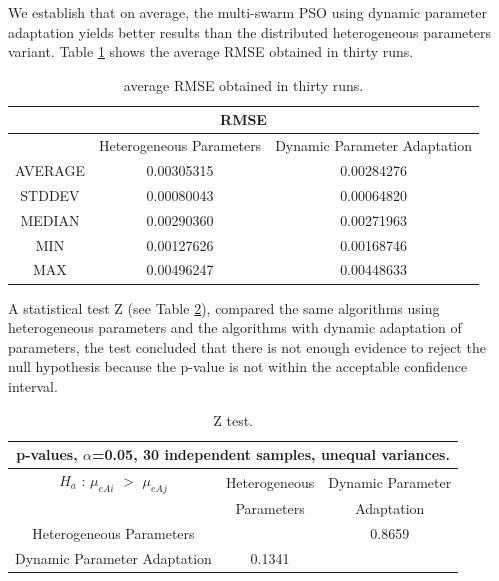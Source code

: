 \documentclass[graybox]{svmult}
\begin{document}
We establish that on average, the multi-swarm PSO using dynamic parameter adaptation yields better results than the distributed heterogeneous parameters variant. Table \ref{tab:rmse} shows the average RMSE obtained in thirty runs.


\begin{table}[htbp]
    \caption{average RMSE obtained in thirty runs.} 
    \label{tab:rmse}
    \centering
    \setlength{\tabcolsep}{8pt}
    \begin{tabular}{|c|c|c|}      \hline
      \multicolumn{3}{|c|}{RMSE} \\ \hline
      & {Heterogeneous Parameters}  & {  Dynamic Parameter Adaptation} \\ \hline
    AVERAGE   & 0.00305315 & 0.00284276 \\ \hline
    STDDEV    & 0.00080043 & 0.00064820 \\ \hline   
    MEDIAN    & 0.00290360 & 0.00271963 \\ \hline 
    MIN       & 0.00127626 & 0.00168746 \\ \hline   
    MAX       & 0.00496247 & 0.00448633 \\ \hline    
   \end{tabular}
\end{table}

A statistical test Z (see Table \ref{tab:ztest}), compared the same algorithms using heterogeneous parameters and the algorithms with dynamic adaptation of parameters, the test concluded that there is not enough evidence to reject the null hypothesis because the p-value is not within the acceptable confidence interval.

\begin{table}[htbp] 
  \caption{Z test.}
  \label{tab:ztest}
  \centering
  \setlength{\tabcolsep}{5pt}
  \begin{tabular}{|c|c|c|}  
  \hline
    \multicolumn{3}{|c|}{  p-values, $\alpha$=0.05, 30 independent samples,  unequal variances.}  \\ [1ex] \hline
    $H_a$ : $\mu_{eAi}$ $>$ $\mu_{eAj}$ &  Heterogeneous  & Dynamic Parameter   \\   
                                        & Parameters      &  Adaptation  \\   \hline
            Heterogeneous Parameters    & \cellcolor{lightgray}    & 0.8659  \\  \hline
         Dynamic Parameter Adaptation   &   0.1341  & \cellcolor{lightgray} \\ \hline    
  \end{tabular}
\end{table}
\end{document}

